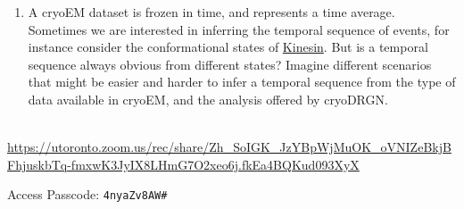 \documentclass[11pt, oneside]{article}   	%
\begin{document}
\begin{enumerate}
	\item A cryoEM dataset is frozen in time, and represents a time average. Sometimes we are interested in inferring the temporal sequence of events, for instance consider the conformational states of \href{https://youtu.be/y-uuk4Pr2i8}{Kinesin}. But is a temporal sequence always obvious from different states? Imagine different scenarios that might be easier and harder to infer a temporal sequence from the type of data available in cryoEM, and the analysis offered by cryoDRGN.
\end{enumerate}
 \\
{\tiny \url{https://utoronto.zoom.us/rec/share/Zh_SoIGK_JzYBpWjMuOK_oVNIZeBkjBFhjuskbTq-fmxwK3JyIX8LHmG7O2xeo6j.fkEa4BQKud093XyX}}

Access Passcode: \texttt{4nyaZv8AW\#}
\end{document}
